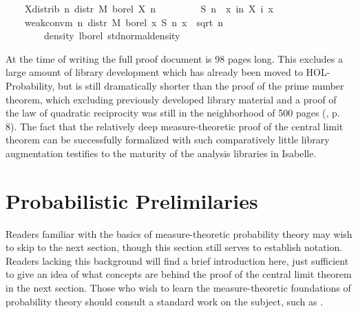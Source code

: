 \documentclass{article}
\theoremstyle{definition}
\begin{document}
\begin{isabellebody}
\ \ \ \ X{\isacharunderscore}distrib{\isacharcolon}\ {\isachardoublequoteopen}{\isasymAnd}n{\isachardot}\ distr\ M\ borel\ {\isacharparenleft}X\ n{\isacharparenright}\ {\isacharequal}\ {\isasymmu}{\isachardoublequoteclose}\isanewline
\ \ \isanewline
\ \ \ \ {\isachardoublequoteopen}S\ n\ {\isasymequiv}\ {\isasymlambda}x{\isachardot}\ {\isasymSum}i{\isacharless}n{\isachardot}\ X\ i\ x{\isachardoublequoteclose}\isanewline
\ \ \isanewline
\ \ \ \ {\isachardoublequoteopen}weak{\isacharunderscore}conv{\isacharunderscore}m\ {\isacharparenleft}{\isasymlambda}n{\isachardot}\ distr\ M\ borel\ {\isacharparenleft}{\isasymlambda}x{\isachardot}\ S\ n\ x\ {\isacharslash}\ sqrt\ {\isacharparenleft}n\ {\isacharasterisk}\ {\isasymsigma}\ \isanewline
\ \ \ \ \ \ \ \ {\isacharparenleft}density\ lborel\ std{\isacharunderscore}normal{\isacharunderscore}density{\isacharparenright}{\isachardoublequoteclose}
\end{isabellebody}

\medskip

At the time of writing the full proof document is 98 pages long. This excludes a large amount of library development which has already been moved to HOL-Probability, but is still dramatically shorter than the proof of the prime number theorem, which excluding previously developed library material and a proof of the law of quadratic reciprocity was still in the neighborhood of 500 pages (\cite{avigad-pnt}, p. 8). The fact that the relatively deep measure-theoretic proof of the central limit theorem can be successfully formalized with such comparatively little library augmentation testifies to the maturity of the analysis libraries in Isabelle.

\section{Probabilistic Prelimilaries}

Readers familiar with the basics of measure-theoretic probability theory may wish to skip to the next section, though this section still serves to establish notation. Readers lacking this background will find a brief introduction here, just sufficient to give an idea of what concepts are behind the proof of the central limit theorem in the next section. Those who wish to learn the measure-theoretic foundations of probability theory should consult a standard work on the subject, such as \cite{billingsley}.
\end{document}
